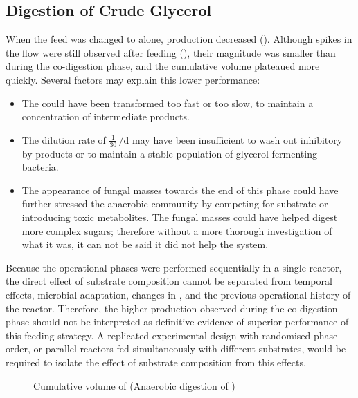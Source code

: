 \subsection{Digestion of Crude Glycerol}
\label{subsec:glycerol_phase}

When the feed was changed to  alone,  production decreased (). Although spikes in the flow were still observed after feeding (), their magnitude was smaller than during the co-digestion phase, and the cumulative  volume plateaued more quickly. Several factors may explain this lower performance:
\begin{itemize}
    \item The  could have been transformed too fast or too slow, to maintain a concentration of intermediate products.
    \item The dilution rate of $\frac{1}{30}\,\unit{\per\day}$ may have been insufficient to wash out inhibitory by-products or to maintain a stable population of glycerol fermenting bacteria.
    \item The appearance of fungal masses towards the end of this phase could have further stressed the anaerobic community by competing for substrate or introducing toxic metabolites. The fungal masses could have helped digest more complex sugars; therefore without a more thorough investigation of what it was, it can not be said it did not help the  system.
\end{itemize}

Because the operational phases were performed sequentially in a single reactor, the direct effect of substrate composition cannot be separated from temporal effects, microbial adaptation, changes in , and the previous operational history of the reactor. Therefore, the higher  production observed during the co-digestion phase should not be interpreted as definitive evidence of superior performance of this feeding strategy. A replicated experimental design with randomised phase order, or parallel reactors fed simultaneously with different substrates, would be required to isolate the effect of substrate composition from this effects.

\begin{figure}[H]
    \centering
    \caption{Cumulative volume of  \unit{\nml} (Anaerobic digestion of )}
    \label{graph:gl-accumulation}
\end{figure}

